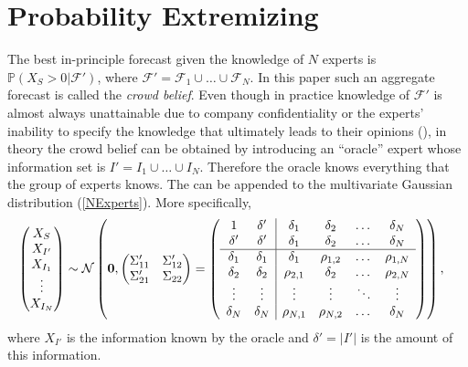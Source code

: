 \documentclass[11pt]{article}
\renewcommand{\P}{\mathbb{P}}
\theoremstyle{definition}
\theoremstyle{definition}
\begin{document}
\section{Probability Extremizing}
\label{extremizing}
The best in-principle forecast given the knowledge of $N$ experts is $\P(X_{S} > 0 |  \mathcal{F}')$, where $\mathcal{F}' = \mathcal{F}_1 \cup \dots \cup \mathcal{F}_N$. In this paper such an aggregate forecast is called the \textit{crowd belief}. Even though in practice knowledge of $\mathcal{F}'$ is almost always unattainable due to company confidentiality or the experts' inability to specify the knowledge that ultimately leads to their opinions (\cite{dawid1995coherent}), in theory the crowd belief can be obtained by introducing an ``oracle'' expert whose information set is $I' = I_1 \cup \dots \cup I_N$. Therefore the oracle  knows everything that the group of experts knows. The can be appended to the multivariate Gaussian distribution (\ref{NExperts}). More specifically, 
\begin{align}
\left(\begin{matrix} X_S \\ X_{I'} \\ X_{I_1}\\ \vdots \\ X_{I_N} \end{matrix}\right) &\sim \mathcal{N}\left( 
 \boldsymbol{0}, \left(\begin{matrix} 
\Sigma_{11}' & \Sigma_{12}'\\
\Sigma_{21}' & \Sigma_{22}\\
 \end{matrix}\right) 
 =
 \left(\begin{array}{c c| c c cc }
1 & \delta' & \delta_1 & \delta_2 & \dots & \delta_N  \\ 
\delta' & \delta' & \delta_1 & \delta_2 & \dots & \delta_N  \\ \hline
\delta_1& \delta_1 & \delta_1 &\rho_{1,2} & \dots & \rho_{1,N}   \\ 
\delta_2 & \delta_2 &\rho_{2,1} & \delta_2 & \dots & \rho_{2,N}  \\ 
\vdots &\vdots & \vdots & \vdots & \ddots & \vdots  \\ 
\delta_N &\delta_N & \rho_{N,1} & \rho_{N,2} & \dots & \delta_N\\ 
 \end{array}\right)\right),  \label{NExpertsOracle}
\end{align}
where  $X_{I'}$  is the information known by the oracle and $\delta' = |I'|$ is the amount of this information. 
\end{document}
